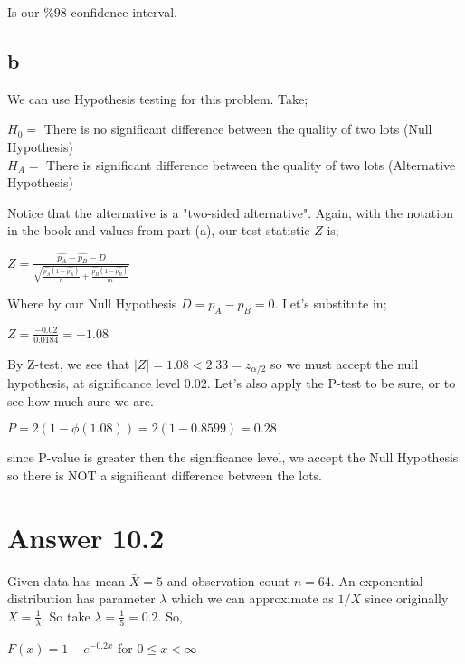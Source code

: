 \documentclass[11pt]{article}
\begin{document}
Is our $\%98$ confidence interval.
\subsection*{b}

We can use Hypothesis testing for this problem. Take;
\begin{flushleft}
$H_0=$ There is no significant difference between the quality of two lots (Null Hypothesis)\\
$H_A=$ There is significant difference between the quality of two lots (Alternative Hypothesis)\\
\end{flushleft}

Notice that the alternative is a "two-sided alternative". Again, with the notation in the book and values from part (a), our test statistic $Z$ is;

\begin{center}

$Z=\frac{\hat{p_A} -\hat{p_B}-D}{\sqrt{\frac{\hat{p_A} (1-\hat{p_A} )}{n}+\frac{\hat{p_B} (1-\hat{p_B} )}{m}}}$
\end{center}

Where by our Null Hypothesis $D=p_A-p_B=0$. Let's substitute in;
\begin{center}
$Z=\frac{-0.02}{0.0184}=-1.08$
\end{center}

By Z-test, we see that $|Z|=1.08<2.33=z_{\alpha /2}$ so we must accept the null hypothesis, at significance level $0.02$.  Let's also apply the P-test to be sure, or to see how much sure we are.

\begin{flushleft}
$P=2(1-\phi(1.08)) = 2(1-0.8599)=0.28$
\end{flushleft}

since P-value is greater then the significance level, we accept the Null Hypothesis so there is NOT a significant difference between the lots.

\section*{Answer 10.2}

Given data has mean $\bar{X} = 5$ and observation count $n=64$. An exponential distribution has parameter $\lambda$ which we can approximate as $1/\bar{X}$ since originally $X=\frac{1}{\lambda}$. So take $\lambda=\frac{1}{5}=0.2$. So,
\begin{center}
$F(x)=1-e^{-0.2x}$ for $0 \leq x < \infty $
\end{center}
\end{document}
